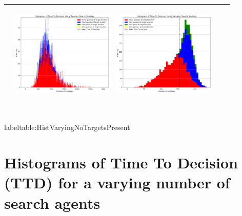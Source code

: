 \begin{landscape}
\begin{table}[h!]
\begin{tabular}{ | c | c | c | c | c |}
\begin{minipage}[c][52mm][c]{49mm}
    \end{minipage}
    &
    \begin{minipage}[c][52mm][c]{49mm}
      \includegraphics[width=49mm, height=49mm]{Chapters/MultiAgentTargetDetection/Figs/Histograms/MultipleTarget/3/3RandomHistogram.png}
    \end{minipage}
    &
    \begin{minipage}[c][52mm][c]{49mm}
      \includegraphics[width=49mm, height=49mm]{Chapters/MultiAgentTargetDetection/Figs/Histograms/MultipleTarget/3/3SaccadicHistogram.png}
    \end{minipage}
    \\
    \hline
   
  \end{tabular}
  \\label{table:HistVaryingNoTargetsPresent}
\end{table}
\break




\vspace*{\fill}
\section{Histograms of Time To Decision (TTD) for a varying number of search agents}


\end{landscape}
